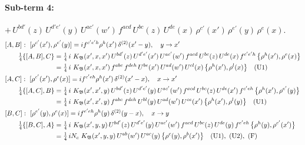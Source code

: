 \documentclass[10pt]{article}
\numberwithin{equation}{section}
\begin{document}
\paragraph{Sub-term 4:} $+\,U^{bd'}(z)\,U^{d'e'}(y)\,U^{ac'}(w')\,f^{acd}\,U^{bc}(z)\,U^{de}(x)\,\rho^{c'}(x')\,\rho^{e'}(y)\,\rho^{e}(x)$.
\begin{align}
&[A,B]:\ [\rho^{c'}(x'),\rho^{e'}(y)]=i f^{c'e'h}\rho^{h}(x')\,\delta^{(2)}(x'-y),\quad y\to x'\notag\\
&\qquad \tfrac14\{[A,B],C\}=\tfrac14\,i\,\,K_{\mathfrak B}(x',x,x')\,U^{bd'}(z)\,U^{d'e'}(x')\,U^{ac'}(w')\,f^{acd}\,U^{bc}(z)\,U^{de}(x)\,f^{c'e'h}\,\big\{\rho^{h}(x'),\rho^{e}(x)\big\}\notag\\
&\qquad\phantom{\tfrac14\{[A,B],C\}}=\tfrac14\,i\,\,K_{\mathfrak B}(x',x,x')\,f^{abc}\,f^{deh}\,U^{be}(x')\,U^{ad}(w')\,U^{cl}(x)\,\big\{\rho^{h}(x'),\rho^{l}(x)\big\}\quad\text{(U1)}
\label{eq:GIII.I-4-AB}\\
&[A,C]:\ [\rho^{c'}(x'),\rho^{e}(x)]=i f^{c'eh}\rho^{h}(x')\,\delta^{(2)}(x'-x),\quad x\to x'\notag\\
&\qquad \tfrac14\{[A,C],B\}=\tfrac14\,i\,\,K_{\mathfrak B}(x',x',y)\,U^{bd'}(z)\,U^{d'e'}(y)\,U^{ac'}(w')\,f^{acd}\,U^{bc}(z)\,U^{de}(x')\,f^{c'eh}\,\big\{\rho^{h}(x'),\rho^{e'}(y)\big\}\notag\\
&\qquad\phantom{\tfrac14\{[A,C],B\}}=\tfrac14\,i\,\,K_{\mathfrak B}(x',x',y)\,f^{abc}\,f^{deh}\,U^{bl}(y)\,U^{ad}(w')\,U^{ce}(x')\,\big\{\rho^{h}(x'),\rho^{l}(y)\big\}\quad\text{(U1)}
\label{eq:GIII.I-4-AC}\\
&[B,C]:\ [\rho^{e'}(y),\rho^{e}(x)]=i f^{e'eh}\rho^{h}(y)\,\delta^{(2)}(y-x),\quad x\to y\notag\\
&\qquad \tfrac14\{[B,C],A\}=\tfrac14\,i\,\,K_{\mathfrak B}(x',y,y)\,U^{bd'}(z)\,U^{d'e'}(y)\,U^{ac'}(w')\,f^{acd}\,U^{bc}(z)\,U^{de}(y)\,f^{e'eh}\,\big\{\rho^{h}(y),\rho^{c'}(x')\big\}\notag\\
&\qquad\phantom{\tfrac14\{[B,C],A\}}=\tfrac14\,i N_{c}\,\,K_{\mathfrak B}(x',y,y)\,U^{ab}(w')\,U^{ac}(y)\,\big\{\rho^{c}(y),\rho^{b}(x')\big\}\quad\text{(U1)},\ \text{(U2)},\ \text{(F)}
\label{eq:GIII.I-4-BC}
\end{align}
\end{document}
